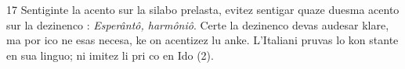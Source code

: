 \begin{VUpage}[21]{17}
Sentiginte la acento sur la silabo prelasta, evitez sentigar\nl
quaze duesma acento sur la dezinenco : \textit{Esperântô, harmôniô}.\nl
Certe la dezinenco devas audesar klare, ma por ico ne esas\nl
necesa, ke on acentizez lu anke. L'Italiani pruvas lo kon\cc
stante en sua linguo; ni imitez li pri co en Ido (2).
\end{VUpage}

